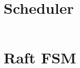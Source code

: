 \section{Scheduler}
\label{anexa4:scheduler}

\begin{code}
    \inputminted{go}{../internal/scheduler/scheduler.go}
    \caption{internal/scheduler/scheduler.go -- All-or-nothing replica planning}
    \label{code:scheduler}
\end{code}

\section{Raft FSM}
\label{anexa5:raft}

\begin{code}
    \inputminted{go}{../internal/cluster/fsm.go}
    \caption{internal/cluster/fsm.go -- Raft Finite State Machine}
    \label{code:fsm}
\end{code}
